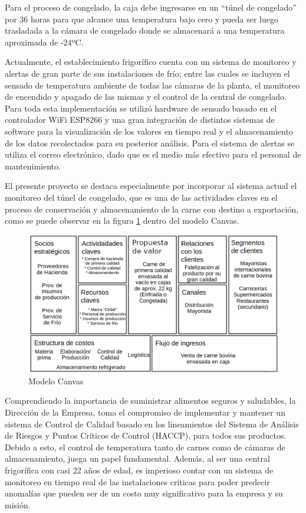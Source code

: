 \documentclass[
11pt, %
]{charter}
\begin{document}
Para el proceso de congelado, la caja debe ingresarse en un “túnel de congelado” por 36 horas para que alcance una temperatura bajo cero y pueda ser luego trasladada a la cámara de congelado donde se almacenará a una temperatura aproximada de -24ºC.

Actualmente, el establecimiento frigorífico cuenta con un sistema de monitoreo y alertas de gran parte de sus instalaciones de frío; entre las cuales se incluyen el sensado de temperatura ambiente de todas las cámaras de la planta, el monitoreo de encendido y apagado de las mismas y el control de la central de congelado. Para toda esta implementación se utilizó hardware de sensado basado en el controlador WiFi ESP8266 y una gran integración de distintos sistemas de software para la visualización de los valores en tiempo real y el almacenamiento de los datos recolectados para su posterior análisis. Para el sistema de alertas se utiliza el correo electrónico, dado que es el medio más efectivo para el personal de mantenimiento.

El presente proyecto se destaca especialmente por incorporar al sistema actual el monitoreo del túnel de congelado, que es una de las actividades claves en el proceso de conservación y almacenamiento de la carne con destino a exportación, como se puede observar en la figura \ref{fig:canvasdone} dentro del modelo Canvas. 

\begin{figure}[htpb]
\centering 
\includegraphics[width=.75\textwidth]{./Figuras/canvasdone.png}
\caption{Modelo Canvas}
\label{fig:canvasdone}
\end{figure}

Comprendiendo la importancia de suministrar alimentos seguros y saludables, la Dirección de la Empresa, toma el compromiso de implementar y mantener un sistema de Control de Calidad basado en los lineamientos del Sistema de Análisis de Riesgos y Puntos Críticos de Control (HACCP), para todos sus productos. Debido a esto, el control de temperatura tanto de carnes como de cámaras de almacenamiento, juega un papel fundamental. Además, al ser una central frigorífica con casi 22 años de edad, es imperioso contar con un sistema de monitoreo en tiempo real de las instalaciones críticas para poder predecir anomalías que pueden ser de un costo muy significativo para la empresa y su misión.
\end{document}
